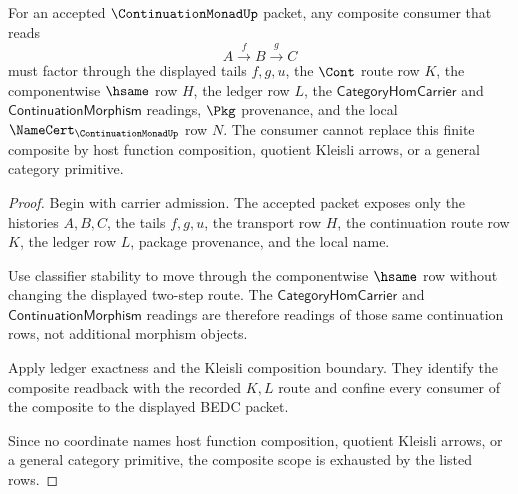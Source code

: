 \begin{theorem}
\label{thm:continuation-monad-kleisli-composite-scope}
For an accepted $\ContinuationMonadUp$ packet, any composite consumer that reads
$$
A \xrightarrow{\,f\,} B \xrightarrow{\,g\,} C
$$
must factor through the displayed tails $f,g,u$, the $\Cont$ route row $K$, the componentwise $\hsame$ row $H$, the ledger row $L$, the $\mathsf{CategoryHomCarrier}$ and $\mathsf{ContinuationMorphism}$ readings, $\Pkg$ provenance, and the local $\NameCert_{\ContinuationMonadUp}$ row $N$. The consumer cannot replace this finite composite by host function composition, quotient Kleisli arrows, or a general category primitive.
\end{theorem}
\begin{proof}
Begin with carrier admission. The accepted packet exposes only the histories $A,B,C$, the tails $f,g,u$, the transport row $H$, the continuation route row $K$, the ledger row $L$, package provenance, and the local name.

Use classifier stability to move through the componentwise $\hsame$ row without changing the displayed two-step route. The $\mathsf{CategoryHomCarrier}$ and $\mathsf{ContinuationMorphism}$ readings are therefore readings of those same continuation rows, not additional morphism objects.

Apply ledger exactness and the Kleisli composition boundary. They identify the composite readback with the recorded $K,L$ route and confine every consumer of the composite to the displayed BEDC packet.

Since no coordinate names host function composition, quotient Kleisli arrows, or a general category primitive, the composite scope is exhausted by the listed rows.
\end{proof}

